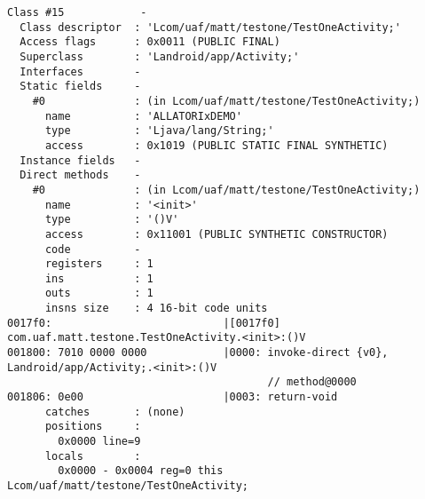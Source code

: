\begin{lstlisting}
Class #15            -
  Class descriptor  : 'Lcom/uaf/matt/testone/TestOneActivity;'
  Access flags      : 0x0011 (PUBLIC FINAL)
  Superclass        : 'Landroid/app/Activity;'
  Interfaces        -
  Static fields     -
    #0              : (in Lcom/uaf/matt/testone/TestOneActivity;)
      name          : 'ALLATORIxDEMO'
      type          : 'Ljava/lang/String;'
      access        : 0x1019 (PUBLIC STATIC FINAL SYNTHETIC)
  Instance fields   -
  Direct methods    -
    #0              : (in Lcom/uaf/matt/testone/TestOneActivity;)
      name          : '<init>'
      type          : '()V'
      access        : 0x11001 (PUBLIC SYNTHETIC CONSTRUCTOR)
      code          -
      registers     : 1
      ins           : 1
      outs          : 1
      insns size    : 4 16-bit code units
0017f0:                           |[0017f0] com.uaf.matt.testone.TestOneActivity.<init>:()V
001800: 7010 0000 0000            |0000: invoke-direct {v0}, Landroid/app/Activity;.<init>:()V
                                         // method@0000
001806: 0e00                      |0003: return-void
      catches       : (none)
      positions     :
        0x0000 line=9
      locals        :
        0x0000 - 0x0004 reg=0 this Lcom/uaf/matt/testone/TestOneActivity;


\end{lstlisting}
